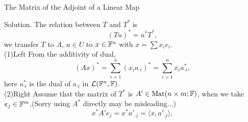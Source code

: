 \documentclass[hyperref={pdfpagelabels=true}]{beamer}
\renewcommand{\L}{\mathcal{L}}
\newcommand{\Mat}{\text{Mat}}
\newcommand{\structb}[1]{\textcolor[rgb]{0.2,0.2,0.7}{#1}}
\newcommand{\<}{\langle}
\renewcommand{\>}{\rangle}
\newenvironment{shrinkeq}[1]%
{ \bgroup
  \addtolength\abovedisplayshortskip{#1}
  \addtolength\abovedisplayskip{#1}
  \addtolength\belowdisplayshortskip{#1}
  \addtolength\belowdisplayskip{#1}}
{\egroup\ignorespacesafterend}
\begin{document}
\begin{frame}{The Matrix of the Adjoint of a Linear Map}
    \begin{block}{Solution.}
        The relation between $T$ and $T^{*}$ is
        \begin{shrinkeq}{-0.3em} 
        \[(Tu)^{*} = u^{*}T^{*},\]
        \end{shrinkeq}
        we transfer $T$ to $A$, $u \in U$ to $x \in \mathbb{F}^{n}$ with $x = \sum x_{i}e_{i}$.\\
        \structb{(1)Left} From the additivity of dual,  
        \[(Ax)^{*} = \sum_{i =1}^{n}(x_{i}a_{\cdot i})^{*} = \sum_{i = 1}^{n}\overline{x_{i}}a_{\cdot i}^{*},\]
        here $a_{\cdot i}^{*}$ is the dual of $a_{\cdot i}$ in $\L(\F^{n},\F)$.\\ 
        \structb{(2)Right}
        Assume that the matrix of $T^{*}$ is $A' \in \Mat(n \times m;\F)$, when we take $e_{j} \in \mathbb{F}^{m}$,(Sorry using $A^{*}$ directly may be misleading...)
        \[x^{*}A'e_{j} = x^{*}a'_{\cdot j} = \<x,a'_{\cdot j}\>,\]
    \end{block}
\end{frame}
\end{document}
